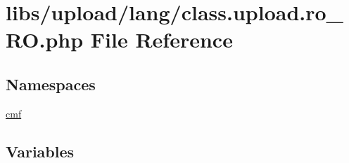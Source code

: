 \hypertarget{class_8upload_8ro___r_o_8php}{}\section{libs/upload/lang/class.upload.\+ro\+\_\+\+R\+O.\+php File Reference}
\label{class_8upload_8ro___r_o_8php}
\subsection*{Namespaces}
\begin{DoxyCompactItemize}
\item 
 \hyperlink{namespacecmf}{cmf}
\end{DoxyCompactItemize}
\subsection*{Variables}
